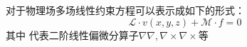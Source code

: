 ﻿对于物理场多场线性约束方程可以表示成如下的形式：
\begin{equation}
\mathcal{L}\cdot {v}(x,y,z)+\mathcal{M}\cdot {f}=0
\end{equation} 
其中 代表二阶线性偏微分算子$\nabla\nabla,\nabla\times\nabla\times$等